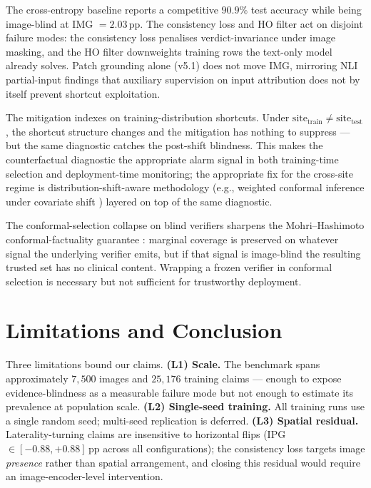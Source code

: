 \documentclass{article}
\begin{document}
The cross-entropy baseline reports a competitive $90.9\%$ test
accuracy while being image-blind at IMG $= 2.03$\,pp. The
consistency loss and HO filter act on disjoint failure modes: the
consistency loss penalises verdict-invariance under image masking,
and the HO filter downweights training rows the text-only model
already solves. Patch grounding alone (v5.1) does not move IMG,
mirroring NLI partial-input findings
\citep{gururangan2018annotation, poliak2018hypothesis} that
auxiliary supervision on input attribution does not by itself
prevent shortcut exploitation.

The mitigation indexes on training-distribution shortcuts. Under
$\mathrm{site}_{\mathrm{train}} \neq \mathrm{site}_{\mathrm{test}}$,
the shortcut structure changes and the mitigation has nothing to
suppress --- but the same diagnostic catches the post-shift
blindness. This makes the counterfactual diagnostic the
appropriate alarm signal in both training-time selection and
deployment-time monitoring; the appropriate fix for the cross-site
regime is distribution-shift-aware methodology (e.g., weighted
conformal inference under covariate shift
\citep{tibshirani2019conformal}) layered on top of the same
diagnostic.

The conformal-selection collapse on blind verifiers sharpens the
Mohri--Hashimoto conformal-factuality guarantee
\citep{mohri2024conformal}: marginal coverage is preserved on
whatever signal the underlying verifier emits, but if that signal
is image-blind the resulting trusted set has no clinical content.
Wrapping a frozen verifier in conformal selection is necessary but
not sufficient for trustworthy deployment.

\section{Limitations and Conclusion}
\label{sec:limits}

Three limitations bound our claims. \textbf{(L1) Scale.} The
benchmark spans approximately $7{,}500$ images and $25{,}176$
training claims --- enough to expose evidence-blindness as a
measurable failure mode but not enough to estimate its prevalence
at population scale. \textbf{(L2) Single-seed training.} All
training runs use a single random seed; multi-seed replication is
deferred. \textbf{(L3) Spatial residual.} Laterality-turning
claims are insensitive to horizontal flips
(IPG $\in [-0.88, +0.88]$\,pp across all configurations); the
consistency loss targets image \emph{presence} rather than spatial
arrangement, and closing this residual would require an
image-encoder-level intervention.
\end{document}
